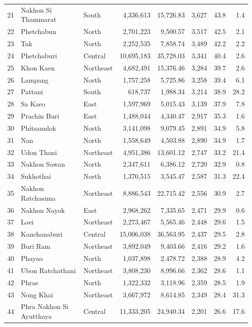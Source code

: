 \begin{longtable}{rllrrrrr}
21 & Nakhon Si Thammarat & South & 4,336,613 & 15,726.83 & 3,627 & 43.8 & 1.4 \\
22 & Phetchabun & North & 2,701,223 & 9,500.57 & 3,517 & 42.5 & 2.1 \\
23 & Tak & North & 2,252,535 & 7,858.74 & 3,489 & 42.2 & 2.2 \\
24 & Phetchaburi & Central & 10,695,183 & 35,728.03 & 3,341 & 40.4 & 2.6 \\
25 & Khon Kaen & Northeast & 4,682,491 & 15,376.46 & 3,284 & 39.7 & 2.6 \\
26 & Lampang & North & 1,757,258 & 5,725.86 & 3,258 & 39.4 & 6.1 \\
27 & Pattani & South & 618,737 & 1,988.34 & 3,214 & 38.9 & 28.2 \\
28 & Sa Kaeo & East & 1,597,969 & 5,015.43 & 3,139 & 37.9 & 7.8 \\
29 & Prachin Buri & East & 1,488,044 & 4,340.47 & 2,917 & 35.3 & 1.6 \\
30 & Phitsanulok & North & 3,141,098 & 9,079.45 & 2,891 & 34.9 & 5.8 \\
31 & Nan & North & 1,558,649 & 4,503.88 & 2,890 & 34.9 & 1.7 \\
32 & Udon Thani & Northeast & 4,951,386 & 13,601.12 & 2,747 & 33.2 & 21.4 \\
33 & Nakhon Sawan & North & 2,347,611 & 6,386.12 & 2,720 & 32.9 & 0.8 \\
34 & Sukhothai & North & 1,370,515 & 3,545.47 & 2,587 & 31.3 & 22.4 \\
35 & Nakhon Ratchasima & Northeast & 8,886,543 & 22,715.42 & 2,556 & 30.9 & 2.7 \\
36 & Nakhon Nayok & East & 2,968,262 & 7,335.65 & 2,471 & 29.9 & 0.6 \\
37 & Loei & Northeast & 2,273,467 & 5,565.46 & 2,448 & 29.6 & 1.5 \\
38 & Kanchanaburi & Central & 15,006,038 & 36,563.95 & 2,437 & 29.5 & 2.8 \\
39 & Buri Ram & Northeast & 3,892,049 & 9,403.66 & 2,416 & 29.2 & 1.6 \\
40 & Phayao & North & 1,037,898 & 2,478.72 & 2,388 & 28.9 & 4.2 \\
41 & Ubon Ratchathani & Northeast & 3,808,230 & 8,996.66 & 2,362 & 28.6 & 1.1 \\
42 & Phrae & North & 1,322,332 & 3,118.96 & 2,359 & 28.5 & 1.9 \\
43 & Nong Khai & Northeast & 3,667,972 & 8,614.85 & 2,349 & 28.4 & 31.3 \\
44 & Phra Nakhon Si Ayutthaya & Central & 11,333,205 & 24,940.34 & 2,201 & 26.6 & 17.6 \\

\end{longtable}
